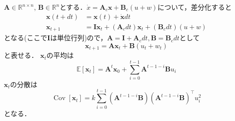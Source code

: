 $\mathbf{A}\in \mathbb{R}^{n\times n}$, $\mathbf{B}\in \mathbb{R}^{n}$とする．$\dot{x}=\mathbf{A}_{c}\mathbf{x}+\mathbf{B}_{c}(u + w)$について，差分化すると
$$
\begin{align}
\mathbf{x}(t+dt)&=\mathbf{x}(t)+\dot{\mathbf{x}}dt\\
\mathbf{x}_{t+1}&=\mathbf{I}\mathbf{x}_t+(\mathbf{A}_{c}dt)\mathbf{x}_t+(\mathbf{B}_{c}dt)(u + w)
\end{align}
$$
となる(ここで$\mathbf{I}$は単位行列)ので，$\mathbf{A}=\mathbf{I}+\mathbf{A}_{c}dt, \mathbf{B}=\mathbf{B}_cdt$として
$$
\mathbf{x}_{t+1} = \mathbf{A} \mathbf{x}_t + \mathbf{B}(u_t + w_t)
$$
と表せる． $\mathbf{x}_t$の平均は
$$
\mathbb{E}\left[\mathbf{x}_{t}\right]=\mathbf{A}^{t} \mathbf{x}_{0}+\sum_{i=0}^{t-1} \mathbf{A}^{t-1-i} \mathbf{B} u_{i}
$$
$\mathbf{x}_t$の分散は
$$
\operatorname{Cov}\left[\mathbf{x}_{t}\right]=k \sum_{i=0}^{t-1}\left(\mathbf{A}^{t-1-i} \mathbf{B}\right)\left(\mathbf{A}^{t-1-i} \mathbf{B}\right)^{\top} u_{i}^{2}
$$
となる．